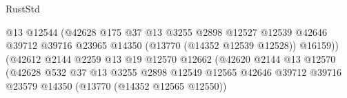 \begin{lexlean}{RustStd}
\begin{coremodule}
                                                      @13
                                                      @12544
                                                      (@42628
                                                        @175
                                                        @37
                                                        @13
                                                        @3255
                                                        @2898
                                                        @12527
                                                        @12539
                                                        @42646
                                                        @39712
                                                        @39716
                                                        @23965
                                                        @14350
                                                        (@13770 (@14352 @12539 @12528))
                                                        @16159))
                                                    (@42612
                                                      @2144
                                                      @2259
                                                      @13
                                                      @19
                                                      @12570
                                                      @12662
                                                      (@42620
                                                        @2144
                                                        @13
                                                        @12570
                                                        (@42628
                                                          @532
                                                          @37
                                                          @13
                                                          @3255
                                                          @2898
                                                          @12549
                                                          @12565
                                                          @42646
                                                          @39712
                                                          @39716
                                                          @23579
                                                          @14350
                                                          (@13770 (@14352 @12565 @12550))

\end{coremodule}
\end{lexlean}
